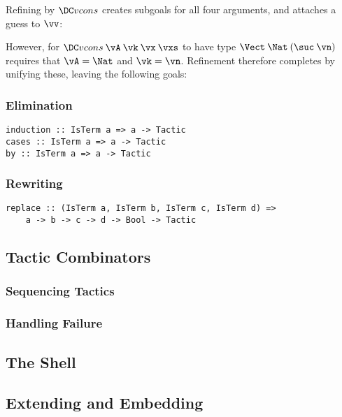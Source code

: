 Refining by $\Vcons$ creates subgoals for all four arguments, and
attaches a guess to $\vv$:
\DM{
\AR{
\hole{\vA}{\Type}\\
\hole{\vk}{\Nat}\\
\hole{\vx}{\vA}\\
\hole{\vxs}{\Vect\:\vA\:\vk}\\
\guess{\vv}{\Vect\:\Nat\:(\suc\:\vn)}{\Vcons\:\vA\:\vk\:\vx\:\vxs}
}
}

However, for $\Vcons\:\vA\:\vk\:\vx\:\vxs$ to have type
$\Vect\:\Nat\:(\suc\:\vn)$ requires that $\vA=\Nat$ and $\vk=\vn$.
Refinement therefore completes by unifying these, leaving the
following goals:
\DM{
\AR{
\hole{\vx}{\Nat}\\
\hole{\vxs}{\Vect\:\Nat\:\vn}\\
\guess{\vv}{\Vect\:\Nat\:(\suc\:\vn)}{\Vcons\:\Nat\:\vn\:\vx\:\vxs}
}
}

\subsubsection{Elimination}

\begin{verbatim}
induction :: IsTerm a => a -> Tactic
cases :: IsTerm a => a -> Tactic
by :: IsTerm a => a -> Tactic
\end{verbatim}

\subsubsection{Rewriting}

\begin{verbatim}
replace :: (IsTerm a, IsTerm b, IsTerm c, IsTerm d) =>
    a -> b -> c -> d -> Bool -> Tactic
\end{verbatim}

\subsection{Tactic Combinators}

\subsubsection{Sequencing Tactics}




\subsubsection{Handling Failure}



\subsection{The Shell}

\subsection{Extending and Embedding}